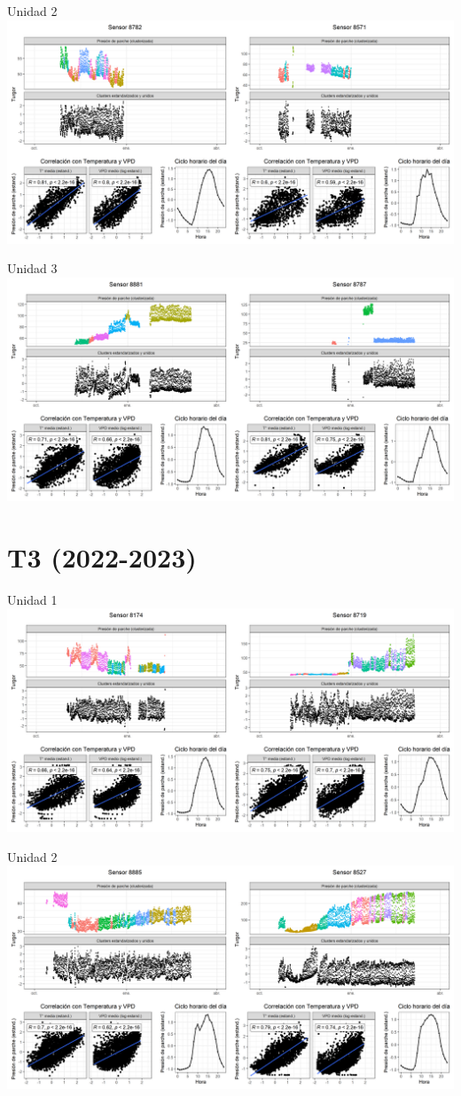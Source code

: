 \documentclass[
  letterpaper,
  DIV=11,
  numbers=noendperiod]{scrreprt}
\begin{document}
Unidad 2
\includegraphics{figuras/03_turgor_union/2022_2023_La_Esperanza_T2_Unidad_2.png}

Unidad 3
\includegraphics{figuras/03_turgor_union/2022_2023_La_Esperanza_T2_Unidad_3.png}

\chapter{T3 (2022-2023)}

Unidad 1
\includegraphics{figuras/03_turgor_union/2022_2023_La_Esperanza_T3_Unidad_1.png}

Unidad 2
\includegraphics{figuras/03_turgor_union/2022_2023_La_Esperanza_T3_Unidad_2.png}
\end{document}
